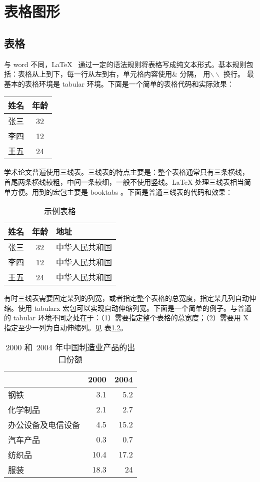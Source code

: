 
\chapter{表格图形}
\label{chap:tabfig}

\section{表格}
与 word 不同，\LaTeX{}~ 通过一定的语法规则将表格写成纯文本形式。基本规则包括：表格从上到下，每一行从左到右，单元格内容使用\& 分隔，
用$\backslash\backslash$ 换行。 最基本的表格环境是 tabular 环境。下面是一个简单的表格代码和实际效果：\\
\begin{center}
\begin{tabular}[t]{l|c}
    \hline
    姓名 & 年龄 \\
    \hline
    张三 & 32 \\
    李四 & 12 \\
    王五 & 24 \\
    \hline
\end{tabular}
\end{center}


学术论文普遍使用三线表。三线表的特点主要是：整个表格通常只有三条横线， 首尾两条横线较粗，中间一条较细，一般不使用竖线。LaTeX 处理三线表相当简 单方便。用到的宏包主要是 booktabs 。下面是普通三线表的代码和效果：
\begin{table}[htbp]
 \caption{\label{tab:test}示例表格}
 \centering
 \begin{tabular}{lcl}
  \toprule
  姓名 & 年龄 & 地址\\
  \midrule
  张三 & 32 & 中华人民共和国\\
  李四 & 12 & 中华人民共和国\\
  王五 & 24 & 中华人民共和国\\
  \bottomrule
 \end{tabular}
\end{table}

有时三线表需要固定某列的列宽，或者指定整个表格的总宽度，指定某几列自动伸缩。使用 tabularx 宏包可以实现自动伸缩列宽。下面是一个简单的例子。与普通的 tabular 环境不同之处在于：（1）需要指定整个表格的总宽度；（2）需要用 X 指定至少一列为自动伸缩列。见
表\ref{tab:test}。

\begin{table}[htbp]
\centering
\caption{\label{tab:test}2000 和~2004 年中国制造业产品的出口份额}
\begin{tabularx}{10cm}{Xrr}
 \toprule & 2000 & 2004 \\
\midrule 钢铁 & 3.1 & 5.2 \\
 化学制品 & 2.1 & 2.7 \\
 办公设备及电信设备 & 4.5 & 15.2 \\
 汽车产品 & 0.3 & 0.7 \\
纺织品 & 10.4 & 17.2 \\
 服装 & 18.3 & 24\\
 \bottomrule
 \end{tabularx}
\end{table}

